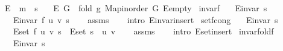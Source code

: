 \begin{isabellebody}
\isanewline
{}\isamarkupfalse%
\ E\ {\isacharcolon}{\kern0pt}{\isacharcolon}{\kern0pt}\ {\isachardoublequoteopen}{\isacharprime}{\kern0pt}m\ {\isasymRightarrow}\ {\isacharprime}{\kern0pt}s{\isachardoublequoteclose}\ \isanewline
\ \ {\isachardoublequoteopen}E\ G\ {\isasymequiv}\ fold\ g\ {\isacharparenleft}{\kern0pt}Map{\isacharunderscore}{\kern0pt}inorder\ G{\isacharparenright}{\kern0pt}\ E{\isacharunderscore}{\kern0pt}empty{\isachardoublequoteclose}\isanewline
\isanewline
{}\isamarkupfalse%
\ invar{\isacharunderscore}{\kern0pt}f{\isacharcolon}{\kern0pt}\isanewline
\ \ \ {\isachardoublequoteopen}E{\isachardot}{\kern0pt}invar\ s{\isachardoublequoteclose}\isanewline
\ \ \ {\isachardoublequoteopen}E{\isachardot}{\kern0pt}invar\ {\isacharparenleft}{\kern0pt}f\ u\ v\ s{\isacharparenright}{\kern0pt}{\isachardoublequoteclose}\isanewline
%
\isadelimproof
\ \ %
\endisadelimproof
%
\isatagproof
{}\isamarkupfalse%
\ assms\isanewline
\ \ \isamarkupfalse%
\ {\isacharparenleft}{\kern0pt}intro\ E{\isachardot}{\kern0pt}invar{\isacharunderscore}{\kern0pt}insert{\isacharparenright}{\kern0pt}%
\endisatagproof
{\isafoldproof}%
%
\isadelimproof
\isanewline
%
\endisadelimproof
\isanewline
{}\isamarkupfalse%
\ set{\isacharunderscore}{\kern0pt}f{\isacharunderscore}{\kern0pt}cong{\isacharcolon}{\kern0pt}\isanewline
\ \ \ {\isachardoublequoteopen}E{\isachardot}{\kern0pt}invar\ s{\isachardoublequoteclose}\isanewline
\ \ \ {\isachardoublequoteopen}E{\isachardot}{\kern0pt}set\ {\isacharparenleft}{\kern0pt}f\ u\ v\ s{\isacharparenright}{\kern0pt}\ {\isacharequal}{\kern0pt}\ E{\isachardot}{\kern0pt}set\ s\ {\isasymunion}\ {\isacharbraceleft}{\kern0pt}{\isacharparenleft}{\kern0pt}u{\isacharcomma}{\kern0pt}\ v{\isacharparenright}{\kern0pt}{\isacharbraceright}{\kern0pt}{\isachardoublequoteclose}\isanewline
%
\isadelimproof
\ \ %
\endisadelimproof
%
\isatagproof
{}\isamarkupfalse%
\ assms\isanewline
\ \ \isamarkupfalse%
\ {\isacharparenleft}{\kern0pt}intro\ E{\isachardot}{\kern0pt}set{\isacharunderscore}{\kern0pt}insert{\isacharparenright}{\kern0pt}%
\endisatagproof
{\isafoldproof}%
%
\isadelimproof
\isanewline
%
\endisadelimproof
\isanewline
{}\isamarkupfalse%
\ invar{\isacharunderscore}{\kern0pt}fold{\isacharunderscore}{\kern0pt}f{\isacharcolon}{\kern0pt}\isanewline
\ \ \ {\isachardoublequoteopen}E{\isachardot}{\kern0pt}invar\ s{\isachardoublequoteclose}\isanewline

\end{isabellebody}
